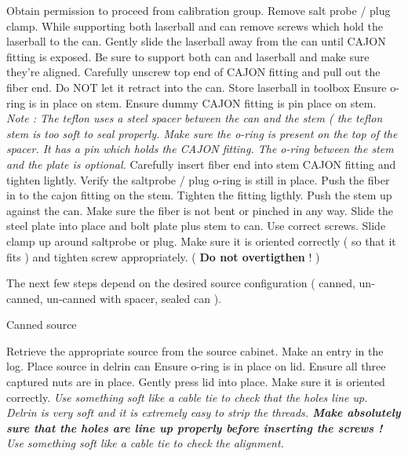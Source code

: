 \begin{enumerate}
      
\checkitem Obtain permission to proceed from calibration group. 
\checkitem Remove salt probe / plug clamp. 
\checkitem While supporting both laserball and can remove screws which hold the laserball to the can.
\checkitem Gently slide the laserball away from the can until CAJON fitting is exposed. Be sure to support both
can and laserball and make sure they're aligned. 
\checkitem Carefully unscrew top end of CAJON fitting and pull out the fiber end. Do NOT let it retract into the can.
\checkitem Store laserball in toolbox
\checkitem Ensure o-ring is in place on stem.
\checkitem Ensure dummy CAJON fitting is pin place on stem.
\small
{\em  
  Note : The teflon uses a steel spacer between the can and the stem ( the teflon stem is too soft to
seal properly. Make sure the o-ring is present on the top of the spacer. It has a pin which holds
the CAJON fitting. The o-ring between the stem and the plate is optional.
}
\normalsize
\checkitem Carefully insert fiber end into stem CAJON fitting and tighten lightly.
\checkitem Verify the saltprobe / plug o-ring is still in place.
\checkitem Push the fiber in to the cajon fitting on the stem. Tighten the fitting ligthly.
\checkitem Push the stem up against the can. Make sure the fiber is not bent or pinched
in any way.
\checkitem Slide the steel plate into place and bolt plate plus stem to can. Use correct screws.
\checkitem Slide clamp up around saltprobe or plug. Make sure it is oriented correctly ( so that
 it fits ) and
tighten screw appropriately. ( {\bf Do not overtigthen  } ! )

  The next few steps depend on the desired source configuration ( canned, un-canned, 
un-canned with spacer, sealed can ).


\checkitem Canned source
 \begin{enumerate}
 \checkitem Retrieve the appropriate source from the source cabinet. Make an entry in the log.
 \checkitem Place source in delrin can
 \checkitem Ensure o-ring is in place on lid. Ensure all three captured nuts are in place.
 \checkitem Gently press lid into place. Make sure it is oriented correctly.
 \small
  {\em Use something soft like a cable tie to check that the holes line up.
  Delrin is very soft and it is extremely easy to strip the threads. { \bf  Make absolutely sure that the
 holes are line up properly before inserting
  the screws ! } Use something soft like a cable tie to check the alignment. }
 \normalsize


\end{enumerate}
\end{enumerate}
